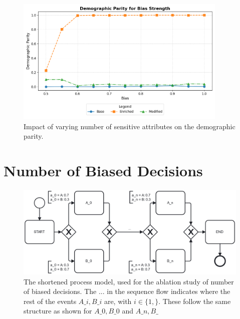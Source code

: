 \begin{figure}[h!]
    \centering
    \includegraphics[width=0.9\textwidth]{gfx/ablation_bias_fairness.png}
    \caption{Impact of varying number of sensitive attributes on the demographic parity.}
    \label{fig:ablation_attributes_fairness}
\end{figure}

\section{Number of Biased Decisions}

\begin{figure}[h!]
    \centering
    \includegraphics[width=\textwidth]{gfx/ablation_decision.png}
    \caption{The shortened process model, used for the ablation study of number of biased decisions.
    The ... in the sequence flow indicates where the rest of the events
    $A\_i, B\_i$ are, with $i \in \{1,\}$.
    These follow the same structure as shown for $A\_0, B\_0$ and $A\_n, B\_$}
    \label{fig:ablation_decision_model}
\end{figure}

